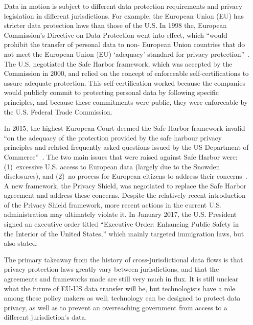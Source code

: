 Data in motion is subject to different data protection requirements and
privacy legislation in different jurisdictions.  For example, the European
Union (EU) has stricter data protection laws than those of the U.S.
In 1998 the, European Commission's Directive on Data Protection went
into effect, which ``would prohibit the transfer of personal data to non-
European Union countries that do not meet the European Union (EU) `adequacy'
standard for privacy protection''~\cite{safeharbor}.  The U.S. negotiated the
Safe Harbor framework, which was accepted by the Commission in 2000, and
relied on the concept of enforceable self-certifications to assure adequate
protection. This self-certification worked because the companies would
publicly commit to protecting personal data by following specific principles,
and because these commitments were public, they were enforceable by the
U.S. Federal Trade Commission.

In 2015, the highest European Court deemed the Safe Harbor framework invalid
``on the adequacy of the protection provided by the safe harbour privacy
principles and related frequently asked questions issued by the US Department
of Commerce''~\cite{safeharbor}.  The two main issues that were raised against
Safe Harbor were: (1)~excessive U.S. access to European data (largely due to
the Snowden disclosures), and (2)~no process for European citizens to address
their concerns~\cite{safeharbor_ps_diffs}.  A new framework, the Privacy
Shield, was negotiated to replace the Safe Harbor agreement and address these
concerns.  Despite the relatively recent introduction of the Privacy Shield
framework, more recent actions in the current U.S. administration may
ultimately violate it.  In January 2017, the U.S. President signed an
executive order titled ``Executive Order: Enhancing Public Safety in the
Interior of the United States,'' which mainly targeted immigration laws, but
also stated:

\begin{displayquote}
\end{displayquote}
\noindent
The primary takeaway from the history of cross-jurisdictional data flows is
that privacy protection laws greatly vary between jurisdictions, and that the
agreements and frameworks made are still very much in flux.  It is
still unclear what the future of EU-US data transfer will be, but
technologists have a role among these policy makers as well; technology can be
designed to protect data privacy, as well as to prevent an overreaching
government from access to a different jurisdiction's data.


